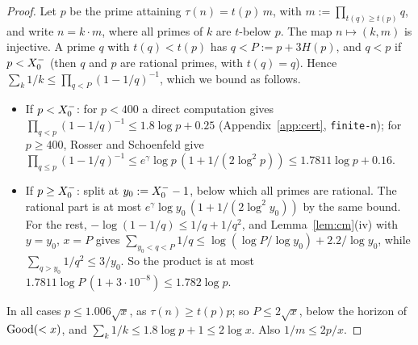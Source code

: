\begin{proof}
Let $p$ be the prime attaining $\tau(n)=t(p)\,m$, with $m:=\prod_{t(q)\ge t(p)}q$, and write $n=k\cdot m$, where all
primes of $k$ are $t$-below $p$. The map $n\mapsto(k,m)$ is injective. A prime $q$ with $t(q)<t(p)$ has $q<P:=p+3H(p)$,
and $q<p$ if $p<X_0^{-}$ (then $q$ and $p$ are rational primes, with $t(q)=q$). Hence
$\sum_k1/k\le\prod_{q<P}(1-1/q)^{-1}$, which we bound as follows.
\begin{itemize}
\item If $p<X_0^{-}$: for $p<400$ a direct computation gives $\prod_{q<p}(1-1/q)^{-1}\le1.8\log p+0.25$ (Appendix~\ref{app:cert}, \texttt{finite-n}); for $p\ge400$,
  Rosser and Schoenfeld \cite[Thm.~8, (3.29)]{RosserSchoenfeld1962} give
  $\prod_{q\le p}(1-1/q)^{-1}\le e^\gamma\log p\,(1+1/(2\log^2p))\le1.7811\log p+0.16$.
\item If $p\ge X_0^{-}$: split at $y_0:=X_0^{-}-1$, below which all primes are rational. The rational part is at most
  $e^\gamma\log y_0\,(1+1/(2\log^2y_0))$ by the same bound. For the rest, $-\log(1-1/q)\le1/q+1/q^2$, and
  Lemma~\ref{lem:cm}(iv) with $y=y_0$, $x=P$ gives $\sum_{y_0<q<P}1/q\le\log(\log P/\log y_0)+2.2/\log y_0$, while
  $\sum_{q>y_0}1/q^2\le3/y_0$. So the product is at most $1.7811\log P\,(1+3\cdot10^{-8})\le1.782\log p$.
\end{itemize}
In all cases $p\le1.006\sqrt x$, as $\tau(n)\ge t(p)p$; so $P\le2\sqrt x$, below the horizon of $\mathrm{Good}(<x)$, and
$\sum_k1/k\le1.8\log p+1\le2\log x$. Also $1/m\le2p/x$.


\end{proof}
